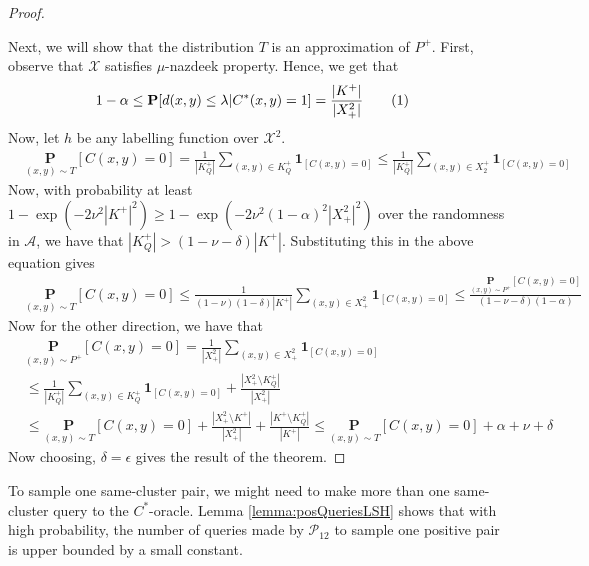 \documentclass[12pt]{article}
\newcommand{\mb}{\mathbf}
\newcommand{\mc}{\mathcal}
\newcommand\numberthis{\addtocounter{equation}{1}\tag{\theequation}}
\begin{document}
\begin{proof}
\begin{enumerate}[noitemsep,label=\textbf{S.\arabic*}]
\end{enumerate}
Next, we will show that the distribution $T$ is an approximation of $P^+$. First, observe that $\mc X$ satisfies $\mu$-nazdeek property. Hence, we get that 
\begin{align*}
  &1 - \alpha \le \mb P[d(x, y) \le \lambda| C^*(x, y) = 1] = \frac{|K^+|}{|X^2_+|} \numberthis\label{eqn:KplusX2plus}
\end{align*}
Now, let $h$ be any labelling function over $\mc X^2$.
\begin{align*}
  &\underset{(x, y) \sim T}{\mb P} [C(x, y) = 0] = \frac{1}{|K_Q^+|}\sum_{(x, y) \in K^+_Q} \mb 1_{[C(x, y) = 0]} \le \frac{1}{|K_Q^+|}\sum_{(x, y) \in X^+_2} \mb 1_{[C(x, y) = 0]}
\end{align*}
Now, with probability at least $1- \exp(-2\nu^2 |K^+|^2) \ge 1- \exp(-2\nu^2 (1-\alpha)^2|X^2_+|^2)$ over the randomness in $\mc A$, we have that $|K_Q^+| > (1-\nu - \delta)|K^+|$. Substituting this in the above equation gives
\begin{align*}
  &\underset{(x, y) \sim T}{\mb P} [C(x, y) = 0]  \le \frac{1}{(1-\nu)(1-\delta)|K^+|}\sum_{(x, y) \in X^2_+} \mb 1_{[C(x, y) = 0]} \le \frac{\underset{(x, y) \sim P^+}{\mb P} [C(x, y) = 0]}{(1-\nu -\delta)(1-\alpha)}
\end{align*}
Now for the other direction, we have that
\begin{align*}
  &\underset{(x, y) \sim P^+}{\mb P} [C(x, y) = 0] = \frac{1}{|X_+^2|}\sum_{(x, y) \in X^2_+} \mb 1_{[C(x, y) = 0]}\\
  &\le \frac{1}{|K_Q^+|}\sum_{(x, y) \in K^+_Q} \mb 1_{[C(x, y) = 0]} + \frac{|X^2_+ \setminus K^+_Q|}{|X_+^2|} \\
  &\le \underset{(x, y) \sim T}{\mb P} [C(x, y) = 0] + \frac{|X^2_+ \setminus K^+|}{|X_+^2|} + \frac{|K^+ \setminus K^+_Q|}{|K^+|} \le \underset{(x, y) \sim T}{\mb P} [C(x, y) = 0] + \alpha + \nu + \delta
\end{align*}
Now choosing, $\delta = \epsilon$ gives the result of the theorem.
\end{proof}

To sample one same-cluster pair, we might need to make more than one same-cluster query to the $C^*$-oracle. Lemma \ref{lemma:posQueriesLSH} shows that with high probability, the number of queries made by $\mc P_{12}$ to sample one positive pair is upper bounded by a small constant. 
\end{document}
